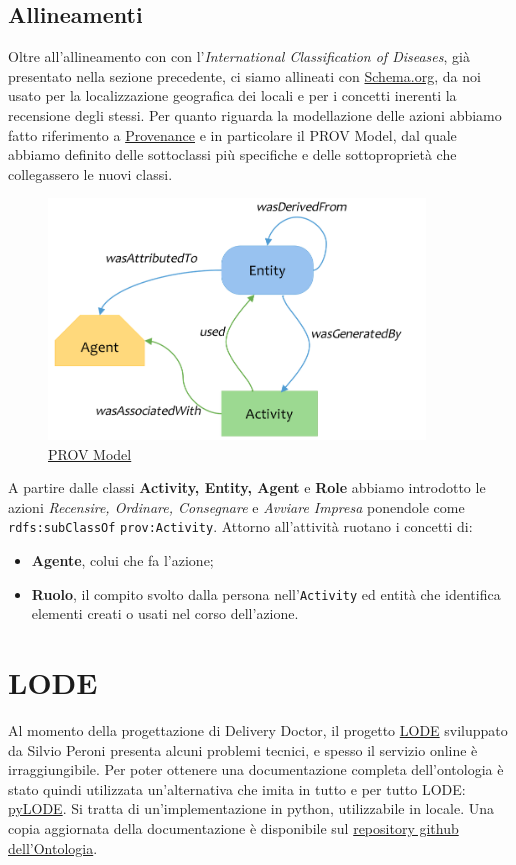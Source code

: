 \documentclass[12pt]{article}
\begin{document}
\subsection{Allineamenti}
Oltre all'allineamento con con l'\textit{International Classification of Diseases}, già presentato nella sezione precedente, ci siamo allineati con \href{https://schema.org/}{Schema.org}, da noi usato per la  localizzazione geografica dei locali e per i concetti inerenti la recensione degli stessi.\newline
Per quanto riguarda la modellazione delle azioni abbiamo fatto riferimento a \href{https://www.w3.org/TR/prov-o/}{Provenance} e in particolare il PROV Model, dal quale abbiamo definito delle sottoclassi più specifiche e delle sottoproprietà che collegassero le nuovi classi.
\begin{figure}[H]
    \centering
    \includegraphics[width=10cm]{files/provenacePattern.png}
    \caption{\href{https://en.wikipedia.org/wiki/PROV_(Provenance)}{PROV Model}}
\end{figure}
A partire dalle classi \textbf{Activity, Entity, Agent} e \textbf{Role} abbiamo introdotto le azioni \textit{Recensire, Ordinare, Consegnare} e \textit{Avviare Impresa} ponendole come \texttt{rdfs:subClassOf} \texttt{prov:Activity}. Attorno all'attività ruotano i concetti di:
\begin{itemize}
    \item \textbf{Agente}, colui che fa l'azione;
    \item \textbf{Ruolo}, il compito svolto dalla persona nell'\texttt{Activity} ed entità che identifica elementi creati o usati nel corso dell'azione.
\end{itemize}

\section{LODE}
Al momento della progettazione di Delivery Doctor, il progetto \href{https://github.com/essepuntato/LODE}{LODE} sviluppato da Silvio Peroni presenta alcuni problemi tecnici, e spesso il servizio online è irraggiungibile. Per poter ottenere una documentazione completa dell'ontologia è stato quindi utilizzata un'alternativa che imita in tutto e per tutto LODE: \href{https://github.com/RDFLib/pyLODE}{pyLODE}. Si tratta di un'implementazione in python, utilizzabile in locale.\newline
Una copia aggiornata della documentazione è disponibile sul \href{https://lorenzosciandra.github.io/ProgettoModSem/documentazione/lode.html}{repository github dell'Ontologia}.
\end{document}
